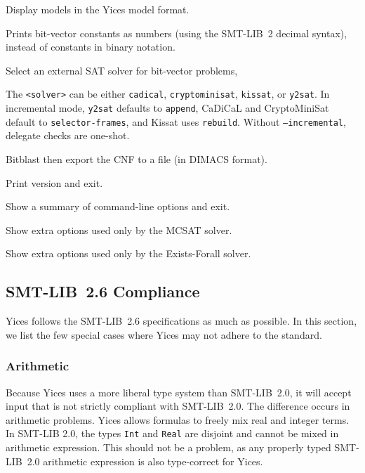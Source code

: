 \documentclass[11pt,twoside,fleqn,openright,titlepage]{cslreport}
\newenvironment{options}{
\begin{list}{}{
\setlength{\labelsep}{1.8ex}
\setlength{\labelwidth}{0pt}
\setlength{\itemindent}{-0.5\leftmargin}
\settowidth{\leftmargin}{\texttt{--}}
\renewcommand{\makelabel}{\optionlabel}}}
{\end{list}}
\newcommand*\optionlabel[1]{\hspace\labelsep\texttt{#1}}
\begin{document}
\begin{options}
\item[--yices-model-format] Display models in the Yices model format.

\item[--bvconst-in-decimal] Prints bit-vector constants as numbers
  (using the SMT-LIB~2 decimal syntax), instead of constants in binary
  notation.

\item[--delegate=<solver>] Select an external SAT solver for bit-vector problems,

   The \texttt{<solver>} can be either \texttt{cadical},
   \texttt{cryptominisat}, \texttt{kissat}, or \texttt{y2sat}. In
   incremental mode, \texttt{y2sat} defaults to \texttt{append},
   CaDiCaL and CryptoMiniSat default to \texttt{selector-frames}, and
   Kissat uses \texttt{rebuild}. Without \texttt{--incremental},
   delegate checks are one-shot.

\item[--dimacs=<filename>] Bitblast then export the CNF to a file (in DIMACS format).

\item[--version, -V] Print version and exit.

\item[--help, -h] Show a summary of command-line options and exit.

\item[--mcsat-help] Show extra options used only by the MCSAT solver.

\item[--ef-help] Show extra options used only by the Exists-Forall solver.

\end{options}


\subsection{SMT-LIB~2.6 Compliance}

Yices follows the SMT-LIB~2.6 specifications as much as possible. In
this section, we list the few special cases where Yices may not adhere
to the standard.

\subsubsection*{Arithmetic}

Because Yices uses a more liberal type system than SMT-LIB~2.0, it
will accept input that is not strictly compliant with SMT-LIB~2.0. The
difference occurs in arithmetic problems. Yices allows formulas to
freely mix real and integer terms. In SMT-LIB 2.0, the types
\texttt{Int} and \texttt{Real} are disjoint and cannot be mixed in
arithmetic expression. This should not be a problem, as any properly
typed SMT-LIB~2.0 arithmetic expression is also type-correct for
Yices.
\end{document}
